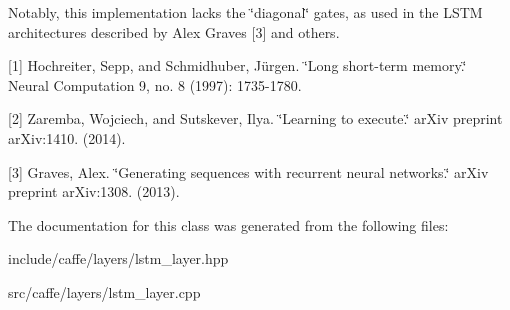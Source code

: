Notably, this implementation lacks the \char`\"{}diagonal\char`\"{} gates, as used in the L\+S\+TM architectures described by Alex Graves \mbox{[}3\mbox{]} and others.

\mbox{[}1\mbox{]} Hochreiter, Sepp, and Schmidhuber, Jürgen. \char`\"{}\+Long short-\/term memory.\char`\"{} Neural Computation 9, no. 8 (1997)\+: 1735-\/1780.

\mbox{[}2\mbox{]} Zaremba, Wojciech, and Sutskever, Ilya. \char`\"{}\+Learning to execute.\char`\"{} ar\+Xiv preprint ar\+Xiv\+:1410. (2014).

\mbox{[}3\mbox{]} Graves, Alex. \char`\"{}\+Generating sequences with recurrent neural networks.\char`\"{} ar\+Xiv preprint ar\+Xiv\+:1308. (2013). 

The documentation for this class was generated from the following files\+:\begin{DoxyCompactItemize}
\item 
include/caffe/layers/lstm\+\_\+layer.\+hpp\item 
src/caffe/layers/lstm\+\_\+layer.\+cpp\end{DoxyCompactItemize}
